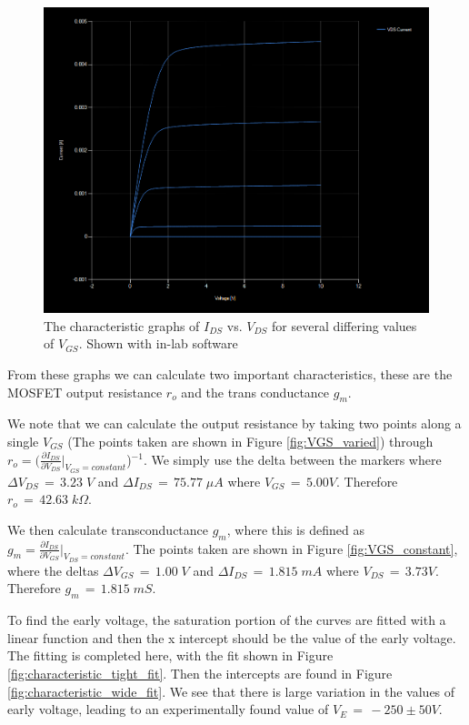 \begin{figure}[ht]
    \centering
    \includegraphics[width=.95\linewidth]{figures/ECE331_Lab3_Data421V1}
    \caption{The characteristic graphs of $I_{DS}$ vs. $V_{DS}$ for several differing values of $V_{GS}$. Shown with in-lab software }
    \label{fig:characteristic_inlab}
\end{figure}

From these graphs we can calculate two important characteristics, these are the MOSFET output resistance $r_o$ and the trans conductance $g_m$.

We note that we can calculate the output resistance by taking two points along a single $V_{GS}$ (The points taken are shown in Figure \ref{fig:VGS_varied}) through $r_o = ( \frac{\partial I_{DS}}{\partial V_{DS}}|_{V_{GS} = constant}$)$^{-1}$. We simply use the delta between the markers where $\Delta V_{DS} \,= \,3.23\; V$  and $\Delta I_{DS} \,= \,75.77\;\mu A$ where $V_{GS}\, = \, 5.00 V$. Therefore $r_o \, = \, 42.63 \;k\Omega$.

We then calculate transconductance $g_m$, where this is defined as $g_m = \frac{\partial I_{DS}}{\partial V_{GS}}|_{V_{DS} = constant}$. The points taken are shown in Figure \ref{fig:VGS_constant}, where the deltas $\Delta V_{GS} \,= \,1.00\; V$  and $\Delta I_{DS} \,= \,1.815\;m A$ where $V_{DS}\, = \, 3.73 V$. Therefore $g_m \, = \, 1.815 \;mS$.

\clearpage

To find the early voltage, the saturation portion of the curves are fitted with a linear function and then the x intercept should be the value of the early voltage. The fitting is completed here, with the fit shown in  Figure \ref{fig:characteristic_tight_fit}. Then the intercepts are found in Figure \ref{fig:characteristic_wide_fit}. We see that there is large variation in the values of early voltage, leading to an experimentally found value of $V_E \, = \, -250 \pm 50 V$.

